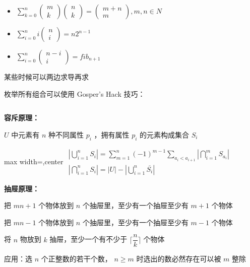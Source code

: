 \documentclass[twocolumn,10pt]{ctexart}
\begin{document}
\begin{itemize}
\item $\sum_{k=0}^n\begin{pmatrix}m\\k\end{pmatrix}\begin{pmatrix}n\\k\end{pmatrix}=\begin{pmatrix}m+n\\m\end{pmatrix},\allowbreak{}m,\allowbreak{}n\in N$
\item $\sum_{i=0}^ni\begin{pmatrix}n\\i\end{pmatrix}=n2^{n-1}$
\item $\sum_{i=0}^n\begin{pmatrix}n-i\\i\end{pmatrix}=fib_{n+1}$
\end{itemize}

\begin{notebox}
某些时候可以两边求导再求

枚举所有组合可以使用 Gosper's Hack 技巧：

\inputminted{cpp}{code/ext_001.cpp}
\end{notebox}

\textbf{容斥原理：}

$U$ 中元素有 $n$ 种不同属性 $p_i$ ，拥有属性 $p_i$ 的元素构成集合 $S_i$

\begin{adjustbox}{max width=\linewidth,center}
$\begin{gathered}
|\bigcup_{i=1}^nS_i|=\sum_{m=1}^n(-1)^{m-1}\sum_{a_i<a_{i+1}}|\bigcap_{i=1}^mS_{a_i}|
\\
|\bigcap_{i=1}^nS_i|=|U|-|\bigcup_{i=1}^n\overline{S_i}|
\end{gathered}$
\end{adjustbox}

\textbf{抽屉原理：}

把 $mn+1$ 个物体放到 $n$ 个抽屉里，至少有一个抽屉至少有 $m+1$ 个物体

把 $mn-1$ 个物体放到 $n$ 个抽屉里，至少有一个抽屉至少有 $m-1$ 个物体

将 $n$ 物放到 $k$ 抽屉，至少一个有不少于 $\lceil\dfrac nk\rceil$ 个物体

\begin{notebox}
应用：选 $n$ 个正整数的若干个数， $n\ge m$ 时选出的数必然存在可以被 $m$ 整除
\end{notebox}
\end{document}
